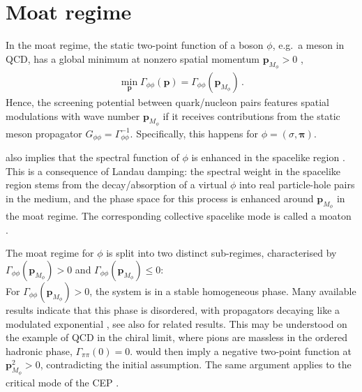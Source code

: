 \documentclass[10pt,prd,superscriptaddress,twocolumn]{revtex4-2}
\begin{document}
\section{Moat regime}
\label{sec:Moat}

In the moat regime, the static two-point function of a boson $\phi$, e.g.~a meson in QCD, has a global minimum at nonzero spatial momentum $\boldsymbol{p}_{M_\phi}>0$ \cite{Pisarski:2021qof},
%
\begin{align}
   \min_{\boldsymbol{p}} \Gamma_{\phi\phi}(\boldsymbol{p}) = \Gamma_{\phi\phi}(\boldsymbol{p}_{M_\phi})\,.
\label{eq:motedef}
\end{align}
%
Hence, the screening potential between quark/nucleon pairs features spatial modulations with wave number $\boldsymbol{p}_{M_\phi}$ if it receives contributions from the static meson propagator $G_{\phi\phi} = \Gamma_{\phi\phi}^{-1}$. Specifically, this happens for $\phi=(\sigma,\boldsymbol{\pi})$. 

 also implies that the spectral function of $\phi$ is enhanced in the spacelike region \cite{Fu:2024rto}. This is a consequence of Landau damping: the spectral weight in the spacelike region stems from the decay/absorption of a virtual $\phi$ into real particle-hole pairs in the medium, and the phase space for this process is enhanced around $\boldsymbol{p}_{M_\phi}$ in the moat regime. The corresponding collective spacelike mode is called a moaton \cite{Fu:2024rto}.

The moat regime for $\phi$ is split into two distinct sub-regimes, characterised by $\Gamma_{\phi\phi}(\boldsymbol{p}_{M_\phi}) > 0$ and $\Gamma_{\phi\phi}(\boldsymbol{p}_{M_\phi}) \leq 0$:\\[-1ex] 


For $\Gamma_{\phi\phi}(\boldsymbol{p}_{M_\phi}) > 0$, the system is in a stable homogeneous phase. Many available results indicate that this phase is disordered, with propagators decaying like a modulated exponential \cite{Fu:2019hdw, Koenigstein:2021llr, Pannullo:2024sov, Topfel:2024iop, Cao:2025zvh, Motta:2025xop, Rennecke:2025kub}, see also \cite{Diaz-Alonso:1998eva, Liu:2007bu, Chakrabarty_2011, Schindler:2019ugo, Pisarski:2020dnx, Schindler:2021otf} for related results. This may be understood on the example of QCD in the chiral limit, where pions are massless in the ordered hadronic phase, $\Gamma_{\pi\pi}(0)=0$.  would then imply a negative two-point function at $\boldsymbol{p}_{M_\phi}^2 > 0$, contradicting the initial assumption. The same argument applies to the critical mode of the CEP \cite{Haensch:2023sig}.\\[-1ex]
\end{document}
